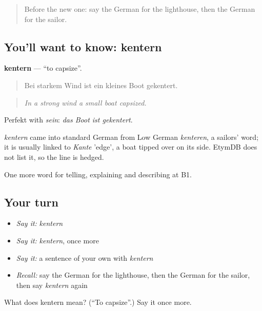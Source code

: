 \label{lesson:GE-C423-kentern}



\begin{quote}
Before the new one: say the German for the lighthouse, then the German for the sailor.
\end{quote}

\subsection*{You'll want to know: kentern}
\textbf{kentern} — \textquotedblleft{}to capsize\textquotedblright{}.

\begin{quote}
Bei starkem Wind ist ein kleines Boot gekentert.
\end{quote}

\begin{quote}
\emph{In a strong wind a small boat capsized.}
\end{quote}

Perfekt with \emph{sein}: \emph{das Boot ist gekentert}.

\begin{cousinweb}
\emph{kentern} came into standard German from Low German \emph{kenteren}, a sailors' word; it is usually linked to \emph{Kante} 'edge', a boat tipped over on its side. EtymDB does not list it, so the line is hedged.
\end{cousinweb}

\begin{grammarlens}[title={What you've built}]
One more word for telling, explaining and describing at B1.
\end{grammarlens}

\subsection*{Your turn}
\begin{itemize}
\raggedright
  \item \emph{Say it:} \emph{kentern}
  \item \emph{Say it:} \emph{kentern}, once more
  \item \emph{Say it:} a sentence of your own with \emph{kentern}
  \item \emph{Recall:} say the German for the lighthouse, then the German for the sailor, then say \emph{kentern} again
\end{itemize}

\begin{tcolorbox}[breakable,colback=teal!4,colframe=teal!35!black,title={Before you move on}]
What does kentern mean? (\textquotedblleft{}To capsize\textquotedblright{}.) Say it once more.
\end{tcolorbox}
